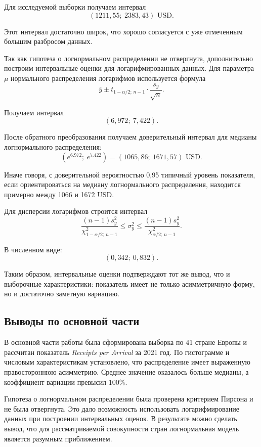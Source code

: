 \documentclass[14pt,a4paper]{extarticle}
\begin{document}
Для исследуемой выборки получаем интервал
\[
(1211,55;\ 2383,43) \text{ USD}.
\]

Этот интервал достаточно широк, что хорошо согласуется с уже отмеченным большим разбросом данных.

Так как гипотеза о логнормальном распределении не отвергнута, дополнительно построим интервальные оценки для логарифмированных данных. Для параметра $\mu$ нормального распределения логарифмов используется формула
\begin{equation}
\overline{y} \pm t_{1-\alpha/2;\,n-1} \cdot \frac{s_y}{\sqrt{n}}.
\end{equation}

Получаем интервал
\[
(6,972;\ 7,422).
\]

После обратного преобразования получаем доверительный интервал для медианы логнормального распределения:
\[
\left(e^{6.972};\ e^{7.422}\right)
=
(1065,86;\ 1671,57) \text{ USD}.
\]

Иначе говоря, с доверительной вероятностью 0,95 типичный уровень показателя, если ориентироваться на медиану логнормального распределения, находится примерно между 1066 и 1672 USD.

Для дисперсии логарифмов строится интервал
\begin{equation}
\frac{(n-1)s_y^2}{\chi^2_{1-\alpha/2;\,n-1}}
\le \sigma_y^2 \le
\frac{(n-1)s_y^2}{\chi^2_{\alpha/2;\,n-1}}.
\end{equation}

В численном виде:
\[
(0,342;\ 0,832).
\]

Таким образом, интервальные оценки подтверждают тот же вывод, что и выборочные характеристики: показатель имеет не только асимметричную форму, но и достаточно заметную вариацию.

\subsection{Выводы по основной части}

В основной части работы была сформирована выборка по 41 стране Европы и рассчитан показатель \textit{Receipts per Arrival} за 2021 год. По гистограмме и числовым характеристикам установлено, что распределение имеет выраженную правостороннюю асимметрию. Среднее значение оказалось больше медианы, а коэффициент вариации превысил 100\%.

Гипотеза о логнормальном распределении была проверена критерием Пирсона и не была отвергнута. Это дало возможность использовать логарифмирование данных при построении интервальных оценок. В результате можно сделать вывод, что для рассматриваемой совокупности стран логнормальная модель является разумным приближением.
\end{document}
